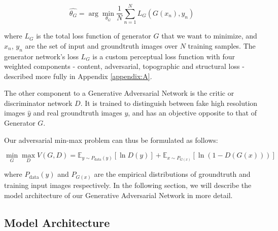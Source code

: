 \documentclass[tc, manuscript]{copernicus}
\begin{document}
\begin{equation}\label{eq:2}
  \hat{\theta_G} = \arg\min_{\theta_G} \frac{1}{N}\sum_{n=1}^{N}L_G(G(x_n), y_n)
\end{equation}

where $L_G$ is the total loss function of generator $G$ that we want to minimize, and $x_n$, $y_n$ are the set of input and groundtruth images over $N$ training samples.
The generator network's loss $L_G$ is a custom perceptual loss function with four weighted components - content, adversarial, topographic and structural loss - described more fully in Appendix \ref{appendix:A}.

The other component to a Generative Adversarial Network is the critic or discriminator network $D$.
It is trained to distinguish between fake high resolution images $\hat{y}$ and real groundtruth images $y$, and has an objective opposite to that of Generator $G$.

Our adversarial min-max problem can thus be formulated as follows:

\begin{equation}\label{eq:3}
  \min_{G} \max_{D} V(G,D) = \mathbb{E}_{y \sim P_{\text{data}}(y)}[\ln D(y)] + \mathbb{E}_{x \sim P_{G(x)}}[\ln(1-D(G(x)))]
\end{equation}

where $P_{\text{data}}(y)$ and $P_{G(x)}$ are the empirical distributions of groundtruth and training input images respectively.
In the following section, we will describe the model architecture of our Generative Adversarial Network in more detail.

\subsection{Model Architecture}
\end{document}
